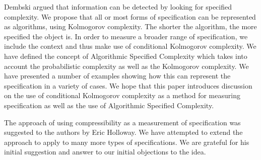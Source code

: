 Dembski argued that information can be detected by looking for specified complexity.
We propose that all or most forms of specification can be represented as algorithms, using Kolmogorov complexity.
The shorter the algorithm, the more specified the object is.
In order to measure a broader range of specification, we include the context and thus make use of conditional Kolmogorov complexity.
We have defined the concept of Algorithmic Specified Complexity which takes into account the probabilistic complexity as well as the Kolmogorov complexity. 
We have presented a number of examples showing how this can represent the specification in a variety of cases.
We hope that this paper introduces discussion on the use of conditional Kolmogorov complexity as a method for measuring specification as well as the use of Algorithmic Specified Complexity.


The approach of using compressibility as a measurement of specification was suggested to the authors by Eric Holloway.
We have attempted to extend the approach to apply to many more types of specifications.
We are grateful for his initial suggestion and answer to our initial objections to the idea.

